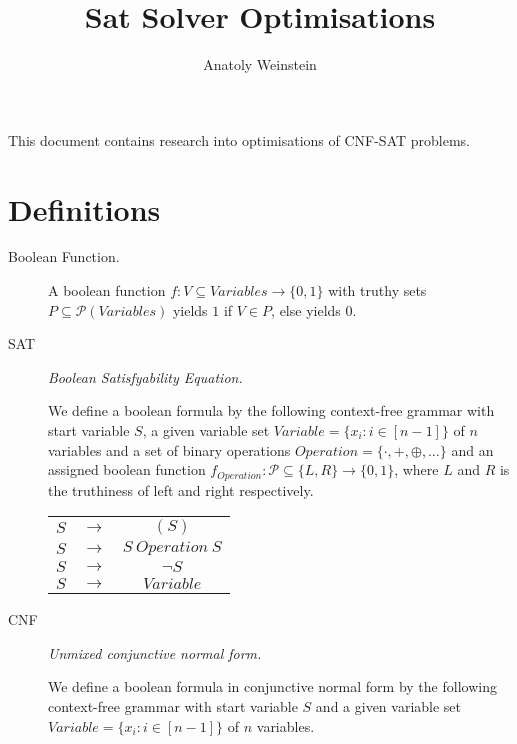 \documentclass[12pt, letterpaper]{article}
\title{Sat Solver Optimisations}
\author{Anatoly Weinstein}
\begin{document}
    \maketitle

    This document contains research into optimisations of CNF-SAT problems.

    \section{Definitions}

    \begin{description}
        \item[Boolean Function.] {
            A boolean function $f: V \subseteq Variables \rightarrow
            \{0, 1\}$ with truthy sets $P \subseteq \mathcal{P}(Variables)$
            yields $1$ if $V \in P$, else yields $0$.
        }
        \item[SAT] {
            \emph{Boolean Satisfyability Equation.}

            We define a boolean formula by the following context-free
            grammar with start variable $S$, a given variable set
            $Variable = \{x_i : i \in [n-1]\}$ of $n$ variables and a
            set of binary operations $Operation = \{\cdot, +, \oplus,
            \dots\}$ and an assigned boolean function $f_{Operation}
            : \mathcal{P} \subseteq \{L, R\} \rightarrow \{0, 1\}$,
            where $L$ and $R$ is the truthiness of left and right 
            respectively.

            \begin{tabular}{ccc}
                $S$ & $\rightarrow$& $(S)$ \\ 
                $S$ & $\rightarrow$& $S\ Operation\ S$ \\ 
                $S$ & $\rightarrow$& $\lnot S$ \\ 
                $S$ & $\rightarrow$& $Variable$ \\ 
            \end{tabular}
        }
        \item[CNF] {
            \emph{Unmixed conjunctive normal form.}

            We define a boolean formula in conjunctive normal form by
            the following context-free grammar with start variable $S$
            and a given variable set $Variable = \{x_i : i \in [n-1]\}$
            of $n$ variables.

}
\end{description}
\end{document}
